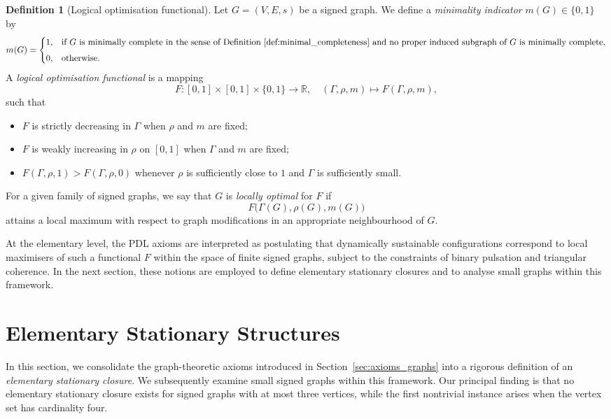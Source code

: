 \documentclass[11pt,a4paper]{article}
\theoremstyle{definition}
\newtheorem{definition}[theorem]{Definition}
\begin{document}
\begin{definition}[Logical optimisation functional]
\label{def:logical_optimisation}
Let $G=(V,E,s)$ be a signed graph. We define a \emph{minimality indicator} $m(G)\in \{0,1\}$ by
\[
 m(G) =
 \begin{cases}
  1, & \text{if $G$ is minimally complete in the sense of Definition~\ref{def:minimal_completeness} and no proper induced subgraph of $G$ is minimally complete},\\[4pt]
  0, & \text{otherwise}.
 \end{cases}
\]
A \emph{logical optimisation functional} is a mapping
\[
 F : [0,1]\times [0,1]\times \{0,1\} \to \mathbb{R},\quad
 (\Gamma,\rho,m) \mapsto F(\Gamma,\rho,m),
\]
such that
\begin{itemize}
  \item $F$ is strictly decreasing in $\Gamma$ when $\rho$ and $m$ are fixed;
  \item $F$ is weakly increasing in $\rho$ on $[0,1]$ when $\Gamma$ and $m$ are fixed;
  \item $F(\Gamma,\rho,1) > F(\Gamma,\rho,0)$ whenever $\rho$ is sufficiently close to $1$ and $\Gamma$ is sufficiently small.
\end{itemize}
For a given family of signed graphs, we say that $G$ is \emph{locally optimal} for $F$ if
\[
 F\bigl(\Gamma(G),\rho(G),m(G)\bigr)
\]
attains a local maximum with respect to graph modifications in an appropriate neighbourhood of $G$.
\end{definition}

At the elementary level, the PDL axioms are interpreted as postulating that dynamically sustainable configurations correspond to local maximisers of such a functional $F$ within the space of finite signed graphs, subject to the constraints of binary pulsation and triangular coherence.\cite{PDL_Intro_2026,PDL_Main_2026,PDL_Global_Mapping_2026} In the next section, these notions are employed to define elementary stationary closures and to analyse small graphs within this framework.

\section{Elementary Stationary Structures}
\label{sec:stationary_closures}

In this section, we consolidate the graph-theoretic axioms introduced in Section~\ref{sec:axioms_graphs} into a rigorous definition of an \emph{elementary stationary closure}. We subsequently examine small signed graphs within this framework. Our principal finding is that no elementary stationary closure exists for signed graphs with at most three vertices, while the first nontrivial instance arises when the vertex set has cardinality four.\cite{PDL_Main_2026,PDL_Intro_2026}
\end{document}
